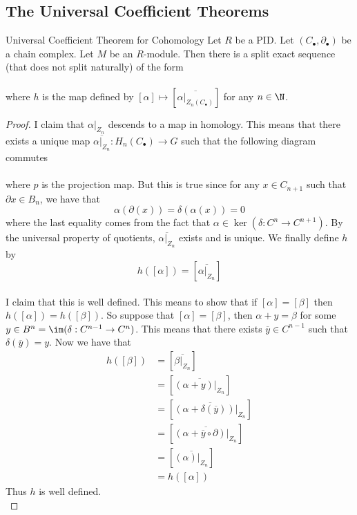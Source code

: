 \documentclass[a4paper]{article}
\begin{document}
\subsection{The Universal Coefficient Theorems}
\begin{thm}{Universal Coefficient Theorem for Cohomology}{} Let $R$ be a PID. Let $(C_\bullet,\partial_\bullet)$ be a chain complex. Let $M$ be an $R$-module. Then there is a split exact sequence (that does not split naturally) of the form \\
\\
where $h$ is the map defined by $[\alpha]\mapsto[\overline{\alpha|_{Z_n(C_\bullet)}}]$ for any $n\in\N$. 
\begin{proof}
I claim that $\alpha|_{Z_n}$ descends to a map in homology. This means that there exists a unique map $\overline{\alpha|_{Z_n}}:H_n(C_\bullet)\to G$ such that the following diagram commutes \\
\\
where $p$ is the projection map. But this is true since for any $x\in C_{n+1}$ such that $\partial x\in B_n$, we have that $$\alpha(\partial(x))=\delta(\alpha(x))=0$$ where the last equality comes from the fact that $\alpha\in\ker(\delta:C^n\to C^{n+1})$. By the universal property of quotients, $\overline{\alpha|_{Z_n}}$ exists and is unique. We finally define $h$ by $$h([\alpha])=\left[\overline{\alpha|_{Z_n}}\right]$$~\\

I claim that this is well defined. This means to show that if $[\alpha]=[\beta]$ then $h([\alpha])=h([\beta])$. So suppose that $[\alpha]=[\beta]$, then $\alpha+y=\beta$ for some $y\in B^n=\im(\delta:C^{n-1}\to C^n)$. This means that there exists $\overline{y}\in C^{n-1}$ such that $\delta(\overline{y})=y$. Now we have that 
\begin{align*}
h([\beta])&=\left[\overline{\beta|_{Z_n}}\right]\\
&=\left[\overline{(\alpha+y)|_{Z_n}}\right]\\
&=\left[\overline{(\alpha+\delta(\overline{y}))|_{Z_n}}\right]\\
&=\left[\overline{(\alpha+\overline{y}\circ\partial)|_{Z_n}}\right]\\
&=\left[\overline{(\alpha)|_{Z_n}}\right]\tag{$\partial$ restricted to $Z_n$ is just $0$}\\
&=h([\alpha])
\end{align*}
Thus $h$ is well defined. \\


\end{proof}
\end{thm}
\end{document}
